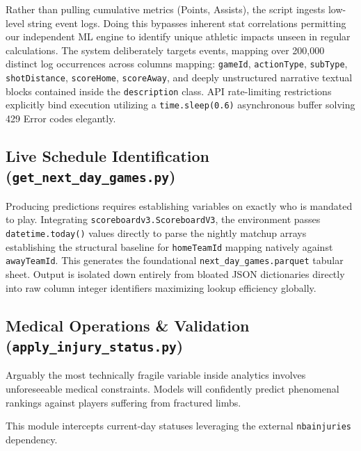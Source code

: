 \documentclass[12pt,a4paper]{article}
\begin{document}
Rather than pulling cumulative metrics (Points, Assists), the script ingests low-level string event logs. Doing this bypasses inherent stat correlations permitting our independent ML engine to identify unique athletic impacts unseen in regular calculations. The system deliberately targets events, mapping over 200,000 distinct log occurrences across columns mapping: \texttt{gameId}, \texttt{actionType}, \texttt{subType}, \texttt{shotDistance}, \texttt{scoreHome}, \texttt{scoreAway}, and deeply unstructured narrative textual blocks contained inside the \texttt{description} class. API rate-limiting restrictions explicitly bind execution utilizing a \texttt{time.sleep(0.6)} asynchronous buffer solving 429 Error codes elegantly. 

\subsection{Live Schedule Identification (\texttt{get\_next\_day\_games.py})}
Producing predictions requires establishing variables on exactly who is mandated to play. Integrating \texttt{scoreboardv3.ScoreboardV3}, the environment passes \texttt{datetime.today()} values directly to parse the nightly matchup arrays establishing the structural baseline for \texttt{homeTeamId} mapping natively against \texttt{awayTeamId}. This generates the foundational \texttt{next\_day\_games.parquet} tabular sheet. Output is isolated down entirely from bloated JSON dictionaries directly into raw column integer identifiers maximizing lookup efficiency globally.

\subsection{Medical Operations \& Validation (\texttt{apply\_injury\_status.py})}
Arguably the most technically fragile variable inside analytics involves unforeseeable medical constraints. Models will confidently predict phenomenal rankings against players suffering from fractured limbs.

This module intercepts current-day statuses leveraging the external \texttt{nbainjuries} dependency. 
\end{document}
